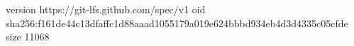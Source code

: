 version https://git-lfs.github.com/spec/v1
oid sha256:f161de44c13dfaffc1d88aaad1055179a019e624bbbd934eb4d3d4335c05cfde
size 11068
